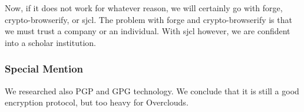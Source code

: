 Now, if it does not work for whatever reason, we will certainly go with forge, crypto-browserify, or sjcl. The problem with forge and crypto-browserify is that we must trust a company or an individual. With sjcl however, we are confident into a scholar institution.

\subsubsection{Special Mention} We researched also PGP\cite{PGP2005PGPDirectory} and GPG\cite{Koch2008UsingGuard} technology. We conclude that it is still a good encryption protocol, but too heavy for Overclouds.


